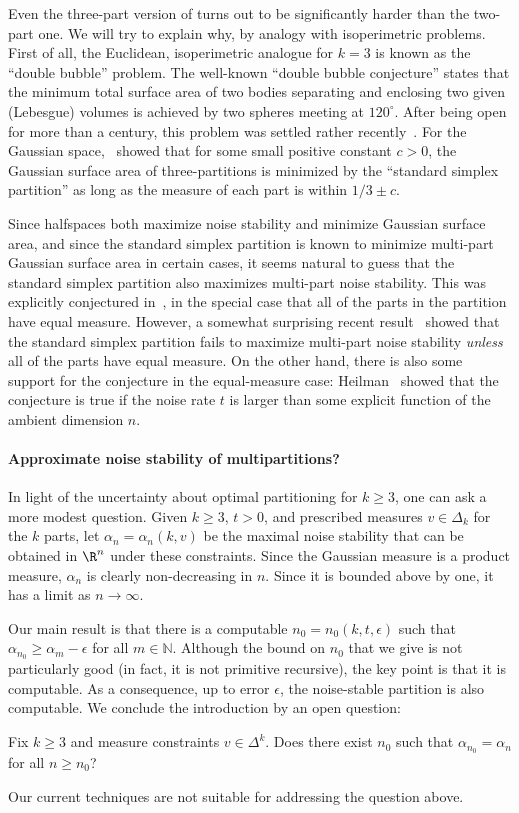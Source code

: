 \documentclass{toc}
\begin{document}
Even the three-part version of  turns out to be
significantly harder than the two-part one. We will try to explain why, by analogy
with isoperimetric problems. First of all, the Euclidean, isoperimetric
analogue for $k=3$ is known as the ``double bubble'' problem.
The well-known  ``double bubble conjecture'' states that the minimum
total surface area of two bodies separating and enclosing two given (Lebesgue)
volumes is achieved by two spheres meeting at $120^\circ$. After being open
for more than a century, this problem was settled rather recently~\cite{HMRR:00, HMRR:02, RHLS:03, Reichardt:08}.
For the Gaussian space,~\cite{Corwin} showed that for some small  positive
constant $c>0$, the Gaussian surface area of three-partitions is minimized by
the ``standard simplex partition'' as long as the measure of each part is within $1/3 \pm c$. 

Since halfspaces both maximize noise stability and minimize Gaussian surface
area, and since the standard simplex partition is known to minimize multi-part
Gaussian surface area in certain cases, it seems natural to guess that the
standard simplex partition also maximizes multi-part noise stability.  This was
explicitly conjectured in~\cite{KKMO04}, in the special case that all of the
parts in the partition have equal measure.  However, a somewhat surprising recent result~\cite{heilman2014} showed that the standard
simplex partition fails to maximize multi-part noise stability \emph{unless}
all of the parts have equal measure.  On the other hand, there is also some
support for the conjecture in the equal-measure case: Heilman~\cite{Heilman:14}
showed that the conjecture is true if the noise rate $t$ is larger than some explicit function of the ambient dimension $n$. 

\paragraph{Approximate noise stability of multipartitions?}
In light of the uncertainty about optimal partitioning for $k \ge 3$, one can
ask a more modest question. Given $k \ge 3$, $t>0$, and prescribed measures $v \in \Delta_k$ for
the $k$ parts, let $\alpha_n = \alpha_n(k, v)$ be the maximal noise stability that can
be obtained in $\R^n$ under these constraints. Since the Gaussian measure
is a product measure, $\alpha_n$ is clearly non-decreasing in $n$.
Since it is bounded above by one, it has a limit as $n \to \infty$.

Our main result is that there is a computable
$n_0=n_0(k,t,\epsilon)$ such that $\alpha_{n_0} \ge \alpha_{m} - \epsilon$ for
all $m \in \mathbb{N}$. Although the bound on $n_0$ that we give is not
particularly good (in fact, it is not primitive recursive), the key point is that it is  computable.
As a consequence, up to error $\epsilon$, the noise-stable partition is
also  computable.
We conclude the introduction by an open question: 
\begin{question}
    Fix $k \ge 3$ and measure constraints $v \in \Delta^k$. Does there exist $n_0$ such that $\alpha_{n_0} = \alpha_{n}$ for all $n \ge n_0$? 
\end{question}
Our current techniques are not suitable for addressing the question above. 
\end{document}
